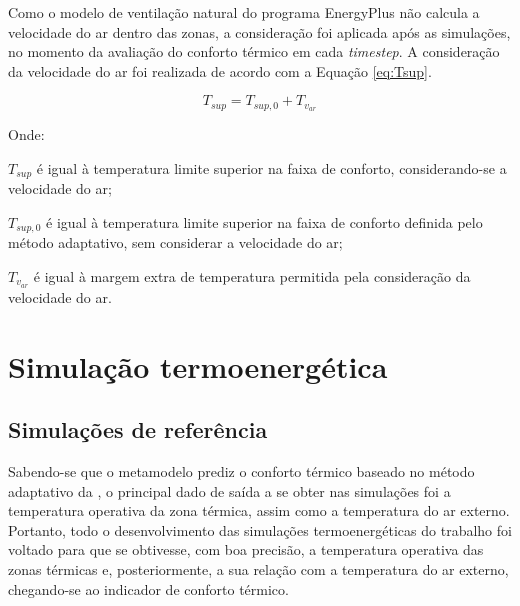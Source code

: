 \documentclass[brazil,hardcopy,openany,a5paper]{ufscthesis}
\begin{document}
		Como o modelo de ventilação natural do programa EnergyPlus não calcula a velocidade do ar dentro das zonas, a consideração foi aplicada após as simulações, no momento da avaliação do conforto térmico em cada \textit{timestep}. A consideração da velocidade do ar foi realizada de acordo com a Equação \ref{eq:Tsup}.
		
		\begin{equation}
		\label{eq:Tsup}
		T_{sup} = T_{sup,0} + T_{v_{ar}}
		\end{equation}
		
		Onde:
		
		$T_{sup}$ é igual à temperatura limite superior na faixa de conforto, considerando-se a velocidade do ar;
		
		$T_{sup,0}$ é igual à temperatura limite superior na faixa de conforto definida pelo método adaptativo, sem considerar a velocidade do ar;
		
		$T_{v_{ar}}$ é igual à margem extra de temperatura permitida pela consideração da velocidade do ar.
		\\
		
		\section{Simulação termoenergética}
		
		\subsection{Simulações de referência}
		
		Sabendo-se que o metamodelo prediz o conforto térmico baseado no método adaptativo da  \cite{ASHRAEStandard552017}, o principal dado de saída a se obter nas simulações foi a temperatura operativa da zona térmica, assim como a temperatura do ar externo. Portanto, todo o desenvolvimento das simulações termoenergéticas do trabalho foi voltado para que se obtivesse, com boa precisão, a temperatura operativa das zonas térmicas e, posteriormente, a sua relação com a temperatura do ar externo, chegando-se ao indicador de conforto térmico.
		
\end{document}
